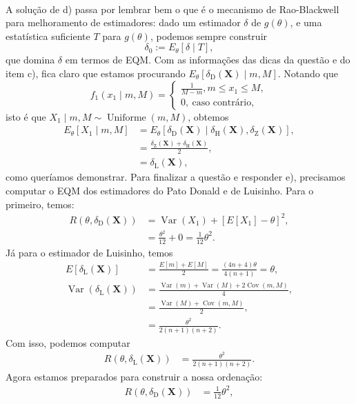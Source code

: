 \documentclass[a4paper,10pt, notitlepage]{report}
\newcommand{\vr}{\operatorname{Var}} %
\newcommand{\bX}{\boldsymbol{X}} %
\begin{document}
{\\
A solução de d) passa por lembrar bem o que é o mecanismo de Rao-Blackwell para melhoramento de estimadores: dado um estimador $\delta$ de $g(\theta)$, e uma estatística suficiente $T$ para $g(\theta)$, podemos sempre construir 
$$
\delta_0 := E_\theta[\delta \mid T],
$$
que domina $\delta$ em termos de EQM.
Com as informações das dicas da questão e do item c), fica claro que estamos procurando $E_\theta[\delta_{\text{D}}(\bX) \mid m, M]$.
Notando que 
$$
f_{1}(x_1 \mid m, M) =  \begin{cases}
     \frac{1}{M-m}, m \leq x_1 \leq M,\\
     0,\:\text{caso contrário},
\end{cases}
$$
isto é que $X_1 \mid m, M \sim \operatorname{Uniforme}(m, M)$, obtemos
\begin{align*}
E_\theta[X_1 \mid m, M] &= E_\theta[\delta_{\text{D}}(\bX) \mid \delta_{\text{H}}(\bX), \delta_{\text{Z}}(\bX)],\\
&= \frac{\delta_{\text{Z}}(\bX)  + \delta_{\text{H}}(\bX)}{2},\\
&= \delta_{\text{L}}(\bX),
\end{align*}
como queríamos demonstrar.
Para finalizar a questão e responder e), precisamos computar o EQM dos estimadores do Pato Donald e de Luisinho.
Para o primeiro, temos:
\begin{align*}
R(\theta, \delta_{\text{D}}(\bX)) &= \vr(X_1) + \left[E[X_1] - \theta\right]^2,\\
&= \frac{\theta^2}{12} + 0 = \frac{1}{12}\theta^2.
\end{align*}
Já para o estimador de Luisinho, temos 
\begin{align*}
E[\delta_{\text{L}}(\bX)] &= \frac{E[m] + E[M]}{2} = \frac{(4n+4)\theta}{4(n+1)} = \theta,\\
\vr\left( \delta_{\text{L}}(\bX) \right) &= \frac{\vr(m) + \vr(M) + 2\operatorname{Cov}(m,M)}{4},\\
&= \frac{\vr(M) + \operatorname{Cov}(m,M)}{2},\\
&= \frac{\theta^2}{2(n+1)(n+2)}.
\end{align*}
Com isso, podemos computar
\begin{align*}
 R(\theta, \delta_{\text{L}}(\bX)) &= \frac{\theta^2}{2(n+1)(n+2)}.
\end{align*}
Agora estamos preparados para construir a nossa ordenação:
\begin{align*}
 R(\theta, \delta_{\text{D}}(\bX)) &= \frac{1}{12}\theta^2,\\

\end{align*}}
\end{document}

